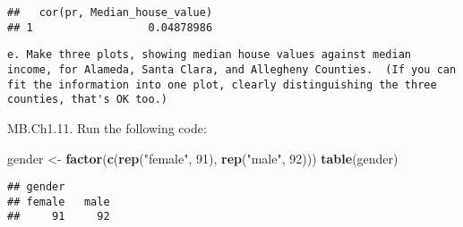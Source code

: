 \documentclass[
]{article}
\newenvironment{Shaded}{\begin{snugshade}}{\end{snugshade}}
\newcommand{\ControlFlowTok}[1]{\textcolor[rgb]{0.13,0.29,0.53}{\textbf{#1}}}
\newcommand{\DecValTok}[1]{\textcolor[rgb]{0.00,0.00,0.81}{#1}}
\newcommand{\KeywordTok}[1]{\textcolor[rgb]{0.13,0.29,0.53}{\textbf{#1}}}
\newcommand{\NormalTok}[1]{#1}
\newcommand{\OperatorTok}[1]{\textcolor[rgb]{0.81,0.36,0.00}{\textbf{#1}}}
\newcommand{\StringTok}[1]{\textcolor[rgb]{0.31,0.60,0.02}{#1}}
\begin{document}
\begin{verbatim}
##   cor(pr, Median_house_value)
## 1                  0.04878986
\end{verbatim}

\begin{verbatim}
e. Make three plots, showing median house values against median income, for Alameda, Santa Clara, and Allegheny Counties.  (If you can fit the information into one plot, clearly distinguishing the three counties, that's OK too.)
\end{verbatim}

\begin{Shaded}
\end{Shaded}

MB.Ch1.11. Run the following code:

\begin{Shaded}
\begin{Highlighting}[]
\NormalTok{gender <-}\StringTok{ }\KeywordTok{factor}\NormalTok{(}\KeywordTok{c}\NormalTok{(}\KeywordTok{rep}\NormalTok{(}\StringTok{"female"}\NormalTok{, }\DecValTok{91}\NormalTok{), }\KeywordTok{rep}\NormalTok{(}\StringTok{"male"}\NormalTok{, }\DecValTok{92}\NormalTok{)))}
\KeywordTok{table}\NormalTok{(gender)}
\end{Highlighting}
\end{Shaded}

\begin{verbatim}
## gender
## female   male 
##     91     92
\end{verbatim}
\end{document}
